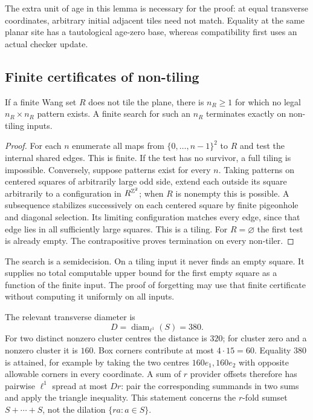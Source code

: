The extra unit of age in this lemma is necessary for the proof: at equal transverse coordinates, arbitrary initial adjacent tiles need not match. Equality at the same planar site has a tautological age-zero base, whereas compatibility first uses an actual checker update.

\subsection{Finite certificates of non-tiling}

\begin{lemma}\label{nw:forbidden}
If a finite Wang set $R$ does not tile the plane, there is $n_R\ge1$ for which no legal $n_R\times n_R$ pattern exists. A finite search for such an $n_R$ terminates exactly on non-tiling inputs.
\end{lemma}
\begin{proof}
For each $n$ enumerate all maps from $\{0,\ldots,n-1\}^2$ to $R$ and test the internal shared edges. This is finite. If the test has no survivor, a full tiling is impossible. Conversely, suppose patterns exist for every $n$. Taking patterns on centered squares of arbitrarily large odd side, extend each outside its square arbitrarily to a configuration in $R^{\mathbb{Z}^2}$; when $R$ is nonempty this is possible. A subsequence stabilizes successively on each centered square by finite pigeonhole and diagonal selection. Its limiting configuration matches every edge, since that edge lies in all sufficiently large squares. This is a tiling. For $R=\varnothing$ the first test is already empty. The contrapositive proves termination on every non-tiler.
\end{proof}

The search is a semidecision. On a tiling input it never finds an empty square. It supplies no total computable upper bound for the first empty square as a function of the finite input. The proof of forgetting may use that finite certificate without computing it uniformly on all inputs.

The relevant transverse diameter is
\begin{equation}\label{nw:diameter}
 D=\operatorname{diam}_{\ell^1}(S)=380.
\end{equation}
For two distinct nonzero cluster centres the distance is $320$; for cluster zero and a nonzero cluster it is $160$. Box corners contribute at most $4\cdot15=60$. Equality $380$ is attained, for example by taking the two centres $160e_1,160e_2$ with opposite allowable corners in every coordinate. A sum of $r$ provider offsets therefore has pairwise $\ell^1$ spread at most $Dr$: pair the corresponding summands in two sums and apply the triangle inequality. This statement concerns the $r$-fold sumset $S+\cdots+S$, not the dilation $\{ra:a\in S\}$.

